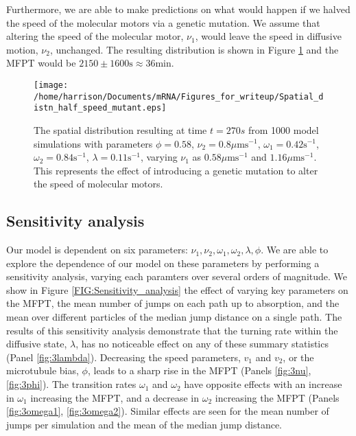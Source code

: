 \documentclass[twocolumn]{biophys}
\begin{document}
Furthermore, we are able to make predictions on what would happen if we halved the speed of the molecular motors via a genetic mutation.
We assume that altering the speed of the molecular motor, $\nu_1$, would leave the speed in diffusive motion, $\nu_2$, unchanged.
The resulting distribution is shown in Figure \ref{FIG:Half_speed_q} and the MFPT would be $2150\pm1600 \text{s} \approx 36\text{min}$.
\begin{figure}[h]
 \centering
 \texttt{[image: /home/harrison/Documents/mRNA/Figures\_for\_writeup/Spatial\_distn\_half\_speed\_mutant.eps]}
 \caption{The spatial distribution resulting at time $t=270s$ from 1000 model simulations with parameters $\phi=0.58$, $\nu_2=0.8 \mu \text{ms}^{-1}$, $\omega_1=0.42 \text{s}^{-1}$, $\omega_2=0.84 \text{s}^{-1}$, $\lambda=0.11 \text{s}^{-1}$, varying $\nu_1$ as $0.58\mu \text{ms}^{-1}$ and $1.16\mu \text{ms}^{-1}$. 
 This represents the effect of introducing a genetic mutation to alter the speed of molecular motors.}
 \label{FIG:Half_speed_q}
\end{figure}

\subsection{Sensitivity analysis}
Our model is dependent on six parameters: $\nu_1, \nu_2, \omega_1, \omega_2, \lambda, \phi$. 
We are able to explore the dependence of our model on these parameters by performing a sensitivity analysis, varying each paramters over several orders of magnitude.
We show  in Figure \ref{FIG:Sensitivity_analysis} the effect of varying key parameters on the MFPT, the mean number of jumps on each path up to absorption, and the mean over different particles of the median jump distance on a single path.
The results of this sensitivity analysis demonstrate that the turning rate within the diffusive state, $\lambda$, has no noticeable effect on any of these summary statistics (Panel \ref{fig:3lambda}).
Decreasing the speed parameters, $v_1$ and $v_2$, or the microtubule bias, $\phi$, leads to a sharp rise in the MFPT (Panels \ref{fig:3nu}, \ref{fig:3phi}). 
The transition rates $\omega_1$ and $\omega_2$ have opposite effects with an increase in $\omega_1$ increasing the MFPT, and a decrease in $\omega_2$ increasing the MFPT (Panels \ref{fig:3omega1}, \ref{fig:3omega2}). 
Similar effects are seen for the mean number of jumps per simulation and the mean of the median jump distance.
\end{document}
